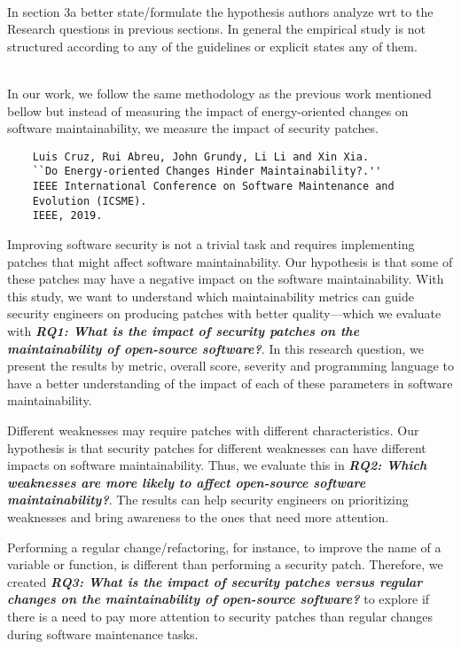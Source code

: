 \documentclass[11pt,fleqn]{article}
\newcommand{\eline}{\vspace*{.75\baselineskip}}
\newcommand{\Referee}[1]{\eline \noindent {\bf Reviewer comment #1:} \\}
\newcommand{\Us}{\eline \noindent {\bf Response:}\\}
\newenvironment{revcomment}[1][]
{\Referee{#1}\begin{rcomment}}
{\end{rcomment}}
\begin{document}
\begin{revcomment}[3.2]

    In section 3a better state/formulate the hypothesis authors 
    analyze wrt to the Research questions in previous sections. 
    In general the empirical study is not structured according to any 
    of the guidelines or explicit states any of them. 

\end{revcomment}

\Us In our work, we follow the same methodology as the previous work 
mentioned bellow but instead of measuring
the impact of energy-oriented changes on software maintainability, 
we measure the impact of security patches.

\begin{verbatim}
    Luis Cruz, Rui Abreu, John Grundy, Li Li and Xin Xia. 
    ``Do Energy-oriented Changes Hinder Maintainability?.'' 
    IEEE International Conference on Software Maintenance and 
    Evolution (ICSME). 
    IEEE, 2019.
\end{verbatim}

Improving software security is not a trivial task and 
requires implementing patches that might affect software 
maintainability. Our hypothesis is that some of these patches may 
have a negative impact on the software maintainability. With this 
study, we want to understand which maintainability metrics can guide 
security engineers on producing patches with better quality---which 
we evaluate with \textit{\textbf{RQ1: What is the impact of security patches on the
maintainability of open-source software?}}. In this research 
question, we present the results by metric, overall score, severity and programming language
to have a better understanding of the impact of each of these parameters in 
software maintainability. 

Different weaknesses may require patches with different characteristics. 
Our hypothesis
is that security patches for different weaknesses can have different 
impacts on software maintainability. Thus, we evaluate this in \textit{\textbf{RQ2: Which weaknesses are more likely to
affect open-source software maintainability?}}. The results can help
security engineers on prioritizing weaknesses and bring awareness to the 
ones that need more attention.

Performing a regular change/refactoring, for instance, to improve the name of 
a variable or function, is different than performing a security patch.
Therefore, we created \textit{\textbf{RQ3: What is the impact of security patches versus 
regular changes on the maintainability of open-source software?}}
to explore if there is a need to pay more attention to 
security patches than regular changes during software maintenance tasks.
\end{document}
